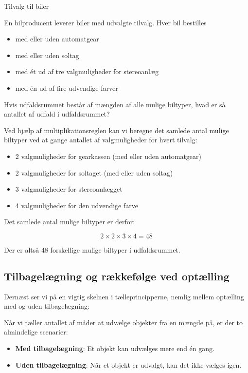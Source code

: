 \begin{example} Tilvalg til biler

En bilproducent leverer biler med udvalgte
tilvalg. Hver bil bestilles

\begin{itemize}
    \item med eller uden automatgear
    \item med eller uden soltag
    \item med ét ud af tre valgmuligheder for stereoanlæg
    \item med én ud af fire udvendige farver
\end{itemize}

Hvis udfaldsrummet består af mængden af alle mulige biltyper, hvad er så antallet af udfald i udfaldsrummet?
\end{example}

\begin{solution}
Ved hjælp af multiplikationsreglen kan vi beregne det samlede antal mulige biltyper ved at gange antallet af valgmuligheder for hvert tilvalg:

\begin{itemize}
    \item 2 valgmuligheder for gearkassen (med eller uden automatgear)
    \item 2 valgmuligheder for soltaget (med eller uden soltag)
    \item 3 valgmuligheder for stereoanlægget
    \item 4 valgmuligheder for den udvendige farve
\end{itemize}

Det samlede antal mulige biltyper er derfor:

\[
2 \times 2 \times 3 \times 4 = 48
\]

Der er altså 48 forskellige mulige biltyper i udfaldsrummet.
\end{solution}

\subsection*{Tilbagelægning og rækkefølge ved optælling}

Dernæst ser vi på en vigtig skelnen i tælleprincipperne, nemlig mellem optælling med og uden tilbagelægning:

\begin{definition}
    Når vi tæller antallet af måder at udvælge objekter fra en mængde på, er der to almindelige scenarier:

    \begin{itemize}
        \item \textbf{Med tilbagelægning}: Et objekt kan udvælges mere end én gang.
        \item \textbf{Uden tilbagelægning}: Når et objekt er udvalgt, kan det ikke vælges igen.
    \end{itemize}
    \end{definition}
    
